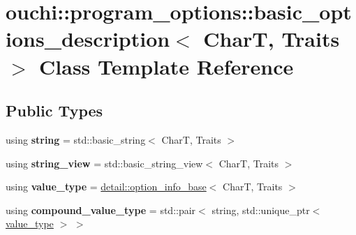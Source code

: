 \hypertarget{classouchi_1_1program__options_1_1basic__options__description}{}\section{ouchi\+::program\+\_\+options\+::basic\+\_\+options\+\_\+description$<$ CharT, Traits $>$ Class Template Reference}
\label{classouchi_1_1program__options_1_1basic__options__description}
\subsection*{Public Types}
\begin{DoxyCompactItemize}
\item 
\mbox{\label{classouchi_1_1program__options_1_1basic__options__description_a4edec3cd5aefd32600a00999101da486}} 
using {\bfseries string} = std\+::basic\+\_\+string$<$ CharT, Traits $>$
\item 
\mbox{\label{classouchi_1_1program__options_1_1basic__options__description_ad47db1dd4100cb8eee5986e331c55bcd}} 
using {\bfseries string\+\_\+view} = std\+::basic\+\_\+string\+\_\+view$<$ CharT, Traits $>$
\item 
\mbox{\label{classouchi_1_1program__options_1_1basic__options__description_ad54826c35d2b06dbeee3584fc6d1507b}} 
using {\bfseries value\+\_\+type} = \mbox{\hyperlink{structouchi_1_1program__options_1_1detail_1_1option__info__base}{detail\+::option\+\_\+info\+\_\+base}}$<$ CharT, Traits $>$
\item 
\mbox{\label{classouchi_1_1program__options_1_1basic__options__description_a0376518fd195050ced2a171aa19e7213}} 
using {\bfseries compound\+\_\+value\+\_\+type} = std\+::pair$<$ string, std\+::unique\+\_\+ptr$<$ \mbox{\hyperlink{structouchi_1_1program__options_1_1detail_1_1option__info__base}{value\+\_\+type}} $>$ $>$
\item 
\mbox{\label{classouchi_1_1program__options_1_1basic__options__description_a8f904797a53e7ad86c21118cebf7d533}} 

\end{DoxyCompactItemize}
